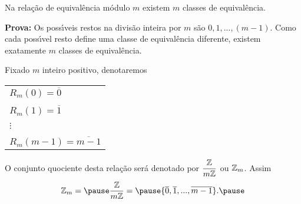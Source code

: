 \documentclass{beamer}
\begin{document}
    \begin{frame}    
        \begin{proposicao}
            Na rela{\c c}{\~a}o de equival{\^e}ncia m{\'o}dulo $m$ existem $m$ classes de equival{\^e}ncia.\pause
        \end{proposicao}
        \noindent \textbf{Prova:}
            Os poss{\'\i}veis restos na divis{\~a}o inteira por $m$ \pause s{\~a}o $0,1,...,(m-1)$. \pause Como cada poss{\'\i}vel resto define uma classe de equival{\^e}ncia diferente, \pause existem exatamente $m$ classes de equival{\^e}ncia.\hspace{.5cm}\qedsymbol\pause
    \end{frame}

    \begin{frame}
        \begin{observacao}
        Fixado $m$ inteiro positivo, \pause denotaremos\pause
        \begin{center}
            \begin{tabular}{l}
                $R_{m}(0) = \overline{0}$\pause \\
                \\
                $R_{m}(1) = \overline{1}$\pause \\
                \\
                $\vdots$\\
                \\
                $R_{m}(m-1) = \overline{m-1}$\pause
            \end{tabular}
        \end{center}

        O conjunto quociente \pause desta rela{\c c}{\~a}o ser{\'a} denotado por $\displaystyle\frac{\mathbb{Z}}{m\mathbb{Z}}$ \pause ou $\mathbb{Z}_m$. \pause Assim\pause
        \[
            \z_m = \pause \displaystyle\frac{\z}{m\z} = \pause \{\overline{0},\overline{1},...,\overline{m-1}\}.\pause
        \]
        \end{observacao}
    \end{frame}
\end{document}
